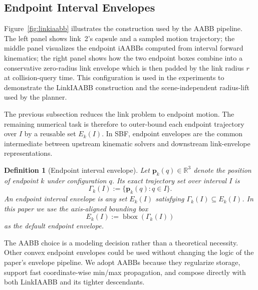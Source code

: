 \documentclass[journal]{IEEEtran}
\DeclareRobustCommand{\textsc}[1]{\textnormal{\MakeUppercase{#1}}}
\newtheorem{definition}{Definition}
\newcommand{\sbf}{\textsc{SBF}}
\newcommand{\iAABB}{\ensuremath{\mathrm{iAABB}}}
\newcommand{\Real}{\ensuremath{\mathbb{R}}}
\begin{document}
\subsection{Endpoint Interval Envelopes}\label{sec:rewrite_endpoint_env}

\noindent Figure~\ref{fig:linkiaabb} illustrates the construction used by the
AABB pipeline. The left panel shows link~2's capsule and a sampled motion
trajectory; the middle panel visualizes the endpoint \iAABB{}s computed from
interval forward kinematics; the right panel shows how the two endpoint boxes
combine into a conservative zero-radius link envelope which is then padded by
the link radius $r$ at collision-query time. This configuration is used in the
experiments to demonstrate the LinkIAABB construction and the scene-independent
radius-lift used by the planner.

The previous subsection reduces the link problem to endpoint motion. The
remaining numerical task is therefore to outer-bound each endpoint trajectory
over $I$ by a reusable set $E_k(I)$. In \sbf{}, endpoint envelopes are the
common intermediate between upstream kinematic solvers and downstream
link-envelope representations.

\begin{definition}[Endpoint interval envelope]\label{def:endpoint_env}
Let $\bm{p}_k(q) \in \Real^3$ denote the position of endpoint $k$ under
configuration $q$. Its exact trajectory set over interval $I$ is
\[
\Gamma_k(I) := \{\bm{p}_k(q) : q\in I\}.
\]
An endpoint interval envelope is any set $E_k(I)$ satisfying
$\Gamma_k(I) \subseteq E_k(I)$. In this paper we use the axis-aligned bounding
box
\[
E_k(I) := \operatorname{bbox}(\Gamma_k(I))
\]
as the default endpoint envelope.
\end{definition}

The AABB choice is a modeling decision rather than a theoretical necessity.
Other convex endpoint envelopes could be used without changing the logic of the
paper's envelope pipeline. We adopt AABBs because they regularize storage, support fast
coordinate-wise min/max propagation, and compose directly with both LinkIAABB
and its tighter descendants.
\end{document}
